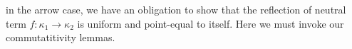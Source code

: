 \documentclass[authoryear, acmsmall, screen, review, nonacm]{acmart}
\begin{document}
\Ni in the arrow case, we have an obligation to show that the reflection of neutral term $f : \kappa_1 \to \kappa_2$ is uniform and point-equal to itself. Here we must invoke our commutatitivity lemmas.

\begin{code}%
\>[0]\AgdaSpace{}%
\AgdaSymbol{\{}\AgdaSpace{}%
\AgdaSymbol{=}\AgdaSpace{}%
\AgdaSpace{}%
\AgdaSpace{}%
\AgdaSymbol{\}}\AgdaSpace{}%
\AgdaSymbol{\{}\AgdaSymbol{\}}\AgdaSpace{}%
\AgdaSpace{}%
\AgdaSymbol{=}\<%
\\
\>[0][@{}l@{\AgdaIndent{0}}]%
\>[2]\AgdaSpace{}%
\AgdaOperator{\AgdaInductiveConstructor{,}}\AgdaSpace{}%
\AgdaSpace{}%
\AgdaOperator{\AgdaInductiveConstructor{,}}\AgdaSpace{}%
\<%
\\
%
\>[2]\<%
\\
\>[2][@{}l@{\AgdaIndent{0}}]%
\>[4]\AgdaSpace{}%
\AgdaSymbol{:}\AgdaSpace{}%
\AgdaSpace{}%
\AgdaSpace{}%
\AgdaSpace{}%
\AgdaSpace{}%
\AgdaSpace{}%
\AgdaSpace{}%
\AgdaSymbol{(}\AgdaSpace{}%
\AgdaSpace{}%
\AgdaSpace{}%
\AgdaSpace{}%
\AgdaSpace{}%
\AgdaSymbol{))}\<%
\\
%
\>[4]\AgdaSpace{}%
\AgdaSpace{}%
\AgdaSpace{}%
\AgdaSpace{}%
\AgdaSpace{}%
\AgdaSpace{}%
\AgdaSymbol{=}\<%
\\
\>[4][@{}l@{\AgdaIndent{0}}]%
\>[6]\<%
\\
\>[6][@{}l@{\AgdaIndent{0}}]%
\>[8]\AgdaSymbol{(}\AgdaSpace{}%
\AgdaSpace{}%
\AgdaSymbol{(}\AgdaSpace{}%
\AgdaSpace{}%
\AgdaSpace{}%
\AgdaSpace{}%
\AgdaSpace{}%
\AgdaSymbol{))}\<%
\\
%
\>[8]\AgdaSymbol{(}\AgdaSpace{}%
\AgdaSymbol{(}\AgdaSpace{}%
\AgdaSpace{}%
\AgdaSymbol{(}\AgdaSpace{}%
\AgdaSymbol{(}\AgdaSpace{}%

\end{code}
\end{document}
